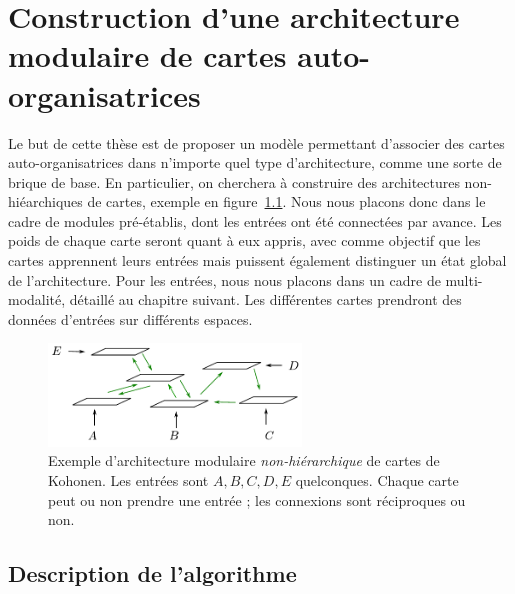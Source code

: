 \chapter{Construction d'une architecture modulaire de cartes auto-organisatrices}


\graphicspath{{03-Algorithme/}}

Le but de cette thèse est de proposer un modèle permettant d'associer des cartes auto-organisatrices dans n'importe quel type d'architecture, comme une sorte de brique de base. En particulier, on cherchera à construire des architectures non-hiéarchiques de cartes, exemple en figure~\ref{fig:archi_non_hierarchique}.
Nous nous placons donc dans le cadre de modules pré-établis, dont les entrées ont été connectées par avance. Les poids de chaque carte seront quant à eux appris, avec comme objectif que les cartes apprennent leurs entrées mais puissent également distinguer un état global de l'architecture.
Pour les entrées, nous nous placons dans un cadre de multi-modalité, détaillé au chapitre suivant. Les différentes cartes prendront des données d'entrées sur différents espaces.

\begin{figure}
\centering
\includegraphics[width=0.6\textwidth]{architecture.pdf}
\caption{Exemple d'architecture modulaire \emph{non-hiérarchique} de cartes de Kohonen. Les entrées sont $A,B,C,D,E$ quelconques. Chaque carte peut ou non prendre une entrée ; les connexions sont réciproques ou non.}
\label{fig:archi_non_hierarchique}
\end{figure}
%

\section{Description de l'algorithme}

